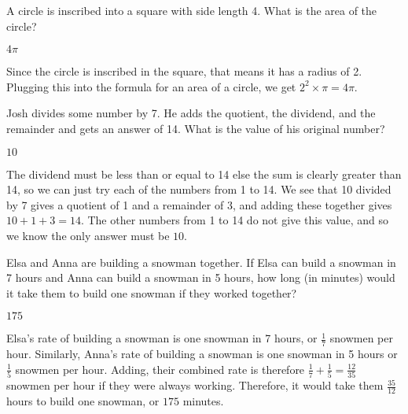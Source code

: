 \documentclass[11pt]{article}
\begin{document}
\begin{problem} %
A circle is inscribed into a square with side length 4. What is the area of the circle?
\end{problem}
\begin{answer}
$\boxed{4\pi}$
\end{answer}
\begin{solution}
Since the circle is inscribed in the square, that means it has a radius of 2. Plugging this into the formula for an area of a circle, we get $2^2\times\pi = \boxed{4\pi}$.
\end{solution}

\begin{problem} %
Josh divides some number by 7. He adds the quotient, the dividend, and the remainder and gets an answer of 14. What is the value of his original number?
\end{problem}

\begin{answer}
$\boxed{10}$
\end{answer}

\begin{solution}
The dividend must be less than or equal to 14 else the sum is clearly greater than 14, so we can just try each of the numbers from 1 to 14. We see that 10 divided by 7 gives a quotient of 1 and a remainder of 3, and adding these together gives $10+1+3=14$. The other numbers from 1 to 14 do not give this value, and so we know the only answer must be $\boxed{10}$.
\end{solution}

\begin{problem} %
Elsa and Anna are building a snowman together. If Elsa can build a snowman in 7 hours and Anna can build a snowman in 5 hours, how long (in minutes) would it take them to build one snowman if they worked together?
\end{problem}
\begin{answer}
$\boxed{175}$
\end{answer}
\begin{solution}
Elsa's rate of building a snowman is one snowman in 7 hours, or $\frac{1}{7}$ snowmen per hour. Similarly, Anna's rate of building a snowman is one snowman in 5 hours or $\frac{1}{5}$ snowmen per hour. Adding, their combined rate is therefore $\frac{1}{7} + \frac{1}{5} = \frac{12}{35}$ snowmen per hour if they were always working. Therefore, it would take them $\frac{35}{12}$ hours to build one snowman, or $\boxed{175}$ minutes.
\end{solution}
\end{document}
